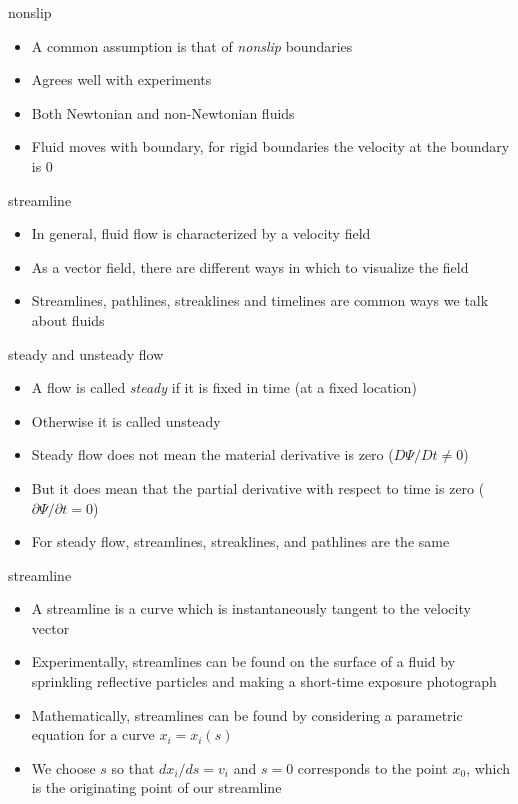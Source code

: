\documentclass[12pt,handout]{beamer}
\providecommand{\tightlist}{%
  \setlength{\itemsep}{0pt}\setlength{\parskip}{0pt}}
\providecommand{\tightlist}{%
\setlength{\itemsep}{0pt}\setlength{\parskip}{0pt}}
\begin{document}
\begin{frame}{nonslip}
\protect\hypertarget{nonslip}{}
\begin{itemize}
\tightlist
\item
  A common assumption is that of \emph{nonslip} boundaries
\item
  Agrees well with experiments
\item
  Both Newtonian and non-Newtonian fluids
\item
  Fluid moves with boundary, for rigid boundaries the velocity at the
  boundary is 0
\end{itemize}
\end{frame}

\begin{frame}{streamline}
\protect\hypertarget{streamline}{}
\begin{itemize}
\tightlist
\item
  In general, fluid flow is characterized by a velocity field
\item
  As a vector field, there are different ways in which to visualize the
  field
\item
  Streamlines, pathlines, streaklines and timelines are common ways we
  talk about fluids
\end{itemize}
\end{frame}

\begin{frame}{steady and unsteady flow}
\protect\hypertarget{steady-and-unsteady-flow}{}
\begin{itemize}
\tightlist
\item
  A flow is called \emph{steady} if it is fixed in time (at a fixed
  location)
\item
  Otherwise it is called unsteady
\item
  Steady flow does not mean the material derivative is zero
  (\(D\Psi/Dt \ne 0\))
\item
  But it does mean that the partial derivative with respect to time is
  zero (\(\partial \Psi / \partial t = 0\))
\item
  For steady flow, streamlines, streaklines, and pathlines are the same
\end{itemize}
\end{frame}

\begin{frame}{streamline}
\protect\hypertarget{streamline-1}{}
\begin{itemize}
\tightlist
\item
  A streamline is a curve which is instantaneously tangent to the
  velocity vector
\item
  Experimentally, streamlines can be found on the surface of a fluid by
  sprinkling reflective particles and making a short-time exposure
  photograph
\item
  Mathematically, streamlines can be found by considering a parametric
  equation for a curve \(x_i = x_i(s)\)
\item
  We choose \(s\) so that \(dx_i/ds = v_i\) and \(s=0\) corresponds to
  the point \(x_0\), which is the originating point of our streamline
\end{itemize}
\end{frame}
\end{document}

